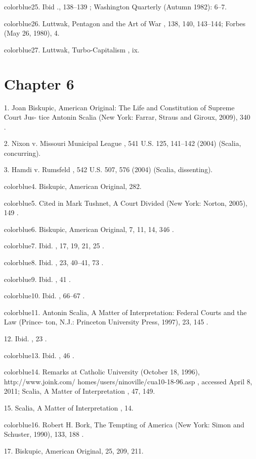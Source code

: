 	{color{blue}25}. Ibid ., 138–139 ; Washington Quarterly (Autumn 1982): 6–7.


	{color{blue}26}. Luttwak, Pentagon and the Art of War , 138, 140, 143–144; Forbes (May 26, 1980), 4.


	{color{blue}27}. Luttwak, Turbo-Capitalism , ix.


\section{Chapter 6}


	{\color{blue}1}. Joan Biskupic, American Original: The Life and Constitution of Supreme Court Jus- tice Antonin Scalia (New York: Farrar, Straus and Giroux, 2009), 340 .


	{\color{blue}2}. Nixon v. Missouri Municipal League , 541 U.S. 125, 141–142 (2004) (Scalia, concurring).


	{\color{blue}3}. Hamdi v. Rumsfeld , 542 U.S. 507, 576 (2004) (Scalia, dissenting).


	{color{blue}4}. Biskupic, American Original, 282.


	{color{blue}5}. Cited in Mark Tushnet, A Court Divided (New York: Norton, 2005), 149 .


	{color{blue}6}. Biskupic, American Original, 7, 11, 14, 346 .


	{color{blue}7}. Ibid. , 17, 19, 21, 25 .


	{color{blue}8}. Ibid. , 23, 40–41, 73 .


	{color{blue}9}. Ibid. , 41 .


	{color{blue}10}. Ibid. , 66–67 .


	{color{blue}11}. Antonin Scalia, A Matter of Interpretation: Federal Courts and the Law (Prince- ton, N.J.: Princeton University Press, 1997), 23, 145 .


	{\color{blue}12}. Ibid. , 23 .


	{color{blue}13}. Ibid. , 46 .


	{color{blue}14}. Remarks at Catholic University (October 18, 1996), http://www.joink.com/ homes/users/ninoville/cua10-18-96.asp , accessed April 8, 2011; Scalia, A Matter of Interpretation , 47, 149.


	{\color{blue}15}. Scalia, A Matter of Interpretation , 14.


	{color{blue}16}. Robert H. Bork, The Tempting of America (New York: Simon and Schuster, 1990), 133, 188 .


	{\color{blue}17}. Biskupic, American Original, 25, 209, 211.


